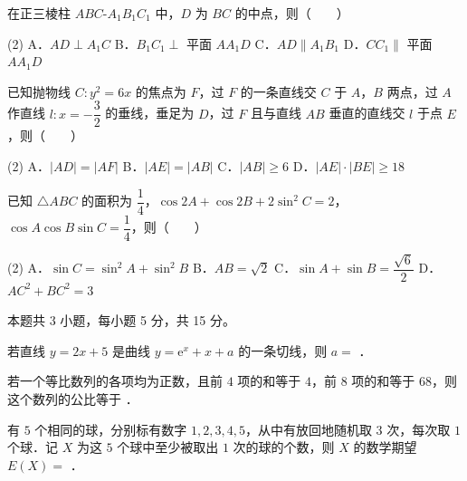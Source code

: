 \begin{question}
在正三棱柱 $ABC\text{-}A_1B_1C_1$ 中，$D$ 为 $BC$ 的中点，则\mbox{（　　）}

\begin{gkopts}(2)
\task A．$AD\perp A_1C$
\task B．$B_1C_1\perp$ 平面 $AA_1D$
\task C．$AD\parallel A_1B_1$
\task D．$CC_1\parallel$ 平面 $AA_1D$
\end{gkopts}

\end{question}
\begin{question}
已知抛物线 $C:y^2=6x$ 的焦点为 $F$，过 $F$ 的一条直线交 $C$ 于 $A$，$B$ 两点，过 $A$ 作直线 $l:x=-\dfrac32$ 的垂线，垂足为 $D$，过 $F$ 且与直线 $AB$ 垂直的直线交 $l$ 于点 $E$，则\mbox{（　　）}

\begin{gkopts}(2)
\task A．$|AD|=|AF|$
\task B．$|AE|=|AB|$
\task C．$|AB|\ge 6$
\task D．$|AE|\cdot|BE|\ge 18$
\end{gkopts}

\end{question}
\begin{question}
已知 $\triangle ABC$ 的面积为 $\dfrac14$，$\cos 2A+\cos 2B+2\sin^2 C=2$，$\cos A\cos B\sin C=\dfrac14$，则\mbox{（　　）}

\begin{gkopts}(2)
\task A．$\sin C=\sin^2 A+\sin^2 B$
\task B．$AB=\sqrt2$
\task C．$\sin A+\sin B=\dfrac{\sqrt6}{2}$
\task D．$AC^2+BC^2=3$
\end{gkopts}

\par\medskip

\end{question}

\begin{gktip}
本题共 3 小题，每小题 5 分，共 15 分。
\end{gktip}

\begin{question}
若直线 $y=2x+5$ 是曲线 $y=\mathrm{e}^{x}+x+a$ 的一条切线，则 $a=$ \gkblank{}．

\end{question}
\begin{question}
若一个等比数列的各项均为正数，且前 $4$ 项的和等于 $4$，前 $8$ 项的和等于 $68$，则这个数列的公比等于 \gkblank{}．

\end{question}
\begin{question}
有 $5$ 个相同的球，分别标有数字 $1,2,3,4,5$，从中有放回地随机取 $3$ 次，每次取 $1$ 个球．记 $X$ 为这 $5$ 个球中至少被取出 $1$ 次的球的个数，则 $X$ 的数学期望 $E(X)=$ \gkblank{}．

\par\medskip

\end{question}

